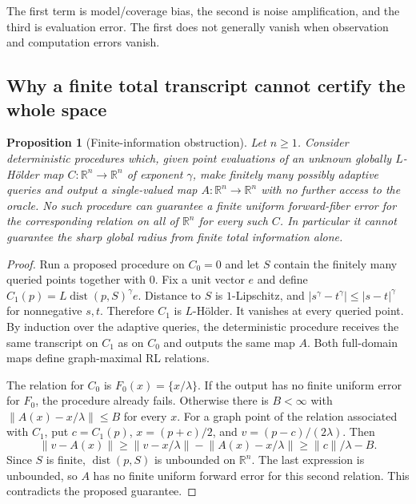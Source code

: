 \documentclass[11pt]{article}
\numberwithin{equation}{section}
\newtheorem{proposition}[theorem]{Proposition}
\theoremstyle{definition}
\theoremstyle{remark}
\newcommand{\R}{\mathbb R}
\newcommand{\dist}{\operatorname{dist}}
\newcommand{\norm}[1]{\lVert #1\rVert}
\newcommand{\abs}[1]{\lvert #1\rvert}
\begin{document}
The first term is model/coverage bias, the second is noise amplification,
and the third is evaluation error. The first does not generally vanish
when observation and computation errors vanish.

\subsection{Why a finite total transcript cannot certify the whole space}

\begin{proposition}[Finite-information obstruction]\label{prop:information}
Let $n\ge1$. Consider deterministic procedures which, given point
evaluations of an unknown globally $L$-H\"older map
$C:\R^n\to\R^n$ of exponent $\gamma$, make finitely many possibly
adaptive queries and output a single-valued map $A:\R^n\to\R^n$
with no further access to the oracle. No such procedure can guarantee
a finite uniform forward-fiber
error for the corresponding relation on all of $\R^n$ for every such
$C$. In particular it cannot guarantee the sharp global radius from
finite total information alone.
\end{proposition}

\begin{proof}
Run a proposed procedure on $C_0=0$ and let $S$ contain the finitely
many queried points together with $0$. Fix a unit vector $e$ and define
$C_1(p)=L\dist(p,S)^\gamma e$. Distance to $S$ is $1$-Lipschitz, and
$\abs{s^\gamma-t^\gamma}\le\abs{s-t}^\gamma$ for nonnegative $s,t$.
Therefore $C_1$ is $L$-H\"older. It vanishes at every queried point.
By induction over the adaptive queries, the deterministic procedure
receives the same transcript on $C_1$ as on $C_0$ and outputs the same
map $A$. Both full-domain maps define graph-maximal RL relations.

The relation for $C_0$ is $F_0(x)=\{x/\lambda\}$. If the output has
no finite uniform error for $F_0$, the procedure already fails. Otherwise
there is $B<\infty$ with
$\norm{A(x)-x/\lambda}\le B$ for every $x$.
For a graph point of the relation associated with $C_1$, put
$c=C_1(p)$, $x=(p+c)/2$, and $v=(p-c)/(2\lambda)$. Then
\[
 \norm{v-A(x)}
 \ge\norm{v-x/\lambda}-\norm{A(x)-x/\lambda}
 \ge\norm c/\lambda-B.
\]
Since $S$ is finite, $\dist(p,S)$ is unbounded on $\R^n$. The last
expression is unbounded, so $A$ has no finite uniform forward error for
this second relation. This contradicts the proposed guarantee.
\end{proof}
\end{document}
